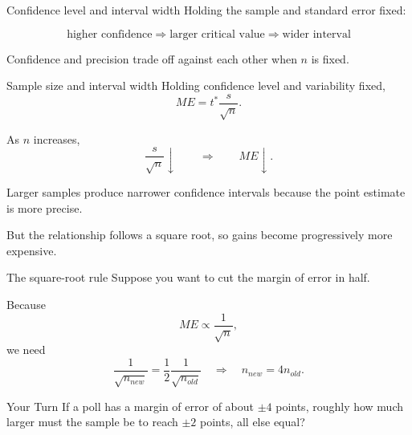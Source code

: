 \documentclass[11pt,aspectratio=169]{beamer}
\newcommand{\yourturn}[1]{%
\begin{center}
\begin{minipage}{0.90\textwidth}
\begin{alertblock}{Your Turn}
#1
\end{alertblock}
\end{minipage}
\end{center}}
\begin{document}
\begin{frame}{Confidence level and interval width}
Holding the sample and standard error fixed:

\begin{center}
\end{center}

\vspace{0.7em}
\[
\text{higher confidence}\Rightarrow\text{larger critical value}\Rightarrow\text{wider interval}
\]

\vfill
\alert{Confidence and precision trade off against each other when $n$ is fixed.}
\end{frame}

\begin{frame}{Sample size and interval width}
Holding confidence level and variability fixed,
\[
ME=t^*\frac{s}{\sqrt{n}}.
\]

As $n$ increases,
\[
\frac{s}{\sqrt{n}}\downarrow
\qquad\Rightarrow\qquad
ME\downarrow.
\]

\vspace{0.8em}
Larger samples produce \alert{narrower confidence intervals} because the point estimate is more precise.

\vfill
But the relationship follows a square root, so gains become progressively more expensive.
\end{frame}

\begin{frame}{The square-root rule}
Suppose you want to cut the margin of error in half.

Because
\[
ME\propto\frac{1}{\sqrt{n}},
\]
we need
\[
\frac{1}{\sqrt{n_{new}}}=\frac{1}{2}\frac{1}{\sqrt{n_{old}}}
\quad\Longrightarrow\quad
\boxed{n_{new}=4n_{old}}.
\]

\vspace{0.5em}
\yourturn{If a poll has a margin of error of about $\pm4$ points, roughly how much larger must the sample be to reach $\pm2$ points, all else equal?}
\end{frame}
\end{document}
